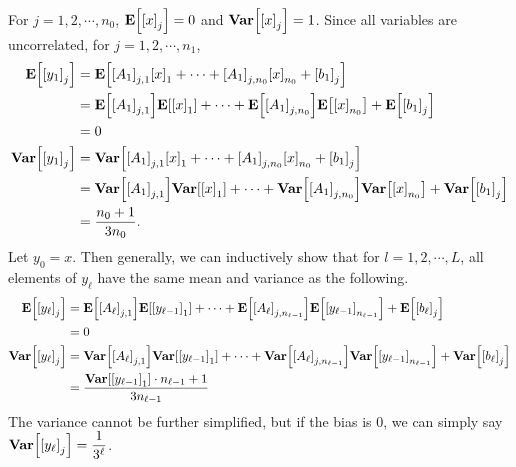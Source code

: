 \documentclass[10pt]{article}
\begin{document}
\vspace{3mm}
For $j = 1, 2, \cdots, n_0$, $\mathbf{E}\qty[\qty[x]_j] = 0$ and $\mathbf{Var}\qty[\qty[x]_j] = 1$.
Since all variables are uncorrelated, for $j = 1, 2, \cdots, n_1$, 
\begin{align*}
    \mathbf{E}\qty[\qty[y_1]_j] &= \mathbf{E}\qty[\qty[A_1]_{j, 1}\qty[x]_1 + \cdots + \qty[A_1]_{j, n_0}\qty[x]_{n_0} + \qty[b_1]_j] \\
    &= \mathbf{E}\qty[\qty[A_1]_{j, 1}]\mathbf{E}\qty[\qty[x]_1] + \cdots + \mathbf{E}\qty[\qty[A_1]_{j, n_0}]\mathbf{E}\qty[\qty[x]_{n_0}] + \mathbf{E}\qty[\qty[b_1]_j] \\
    &= 0 \\
    \mathbf{Var}\qty[\qty[y_1]_j] &= \mathbf{Var}\qty[\qty[A_1]_{j, 1}\qty[x]_1 + \cdots + \qty[A_1]_{j, n_0}\qty[x]_{n_0} + \qty[b_1]_j] \\
    &= \mathbf{Var}\qty[\qty[A_1]_{j, 1}]\mathbf{Var}\qty[\qty[x]_1] + \cdots + \mathbf{Var}\qty[\qty[A_1]_{j, n_0}]\mathbf{Var}\qty[\qty[x]_{n_0}] + \mathbf{Var}\qty[\qty[b_1]_j] \\
    &= \frac{n_0 + 1}{3n_0}.
\end{align*}
Let $y_0 = x$. 
Then generally, we can inductively show that for $l = 1, 2, \cdots, L$, all elements of $y_\ell$ have the same mean and variance as the following.
\begin{align*}
    \mathbf{E}\qty[\qty[y_\ell]_j] &= \mathbf{E}\qty[\qty[A_\ell]_{j, 1}]\mathbf{E}\qty[\qty[y_{\ell-1}]_1] + \cdots + \mathbf{E}\qty[\qty[A_\ell]_{j, n_{\ell-1}}]\mathbf{E}\qty[\qty[y_{\ell-1}]_{n_{\ell-1}}] + \mathbf{E}\qty[\qty[b_\ell]_j] \\
    &= 0 \\
    \mathbf{Var}\qty[\qty[y_\ell]_j] &= \mathbf{Var}\qty[\qty[A_\ell]_{j, 1}]\mathbf{Var}\qty[\qty[y_{\ell-1}]_1] + \cdots + \mathbf{Var}\qty[\qty[A_\ell]_{j, n_{\ell-1}}]\mathbf{Var}\qty[\qty[y_{\ell-1}]_{n_{\ell-1}}] + \mathbf{Var}\qty[\qty[b_\ell]_j] \\
    &= \frac{\mathbf{Var}\qty[\qty[y_{\ell-1}]_1]\cdot n_{\ell-1} + 1}{3n_{\ell-1}}
\end{align*}
The variance cannot be further simplified, but if the bias is 0, we can simply say $\mathbf{Var}\qty[\qty[y_\ell]_j] = \dfrac{1}{3^\ell}$.
\end{document}
